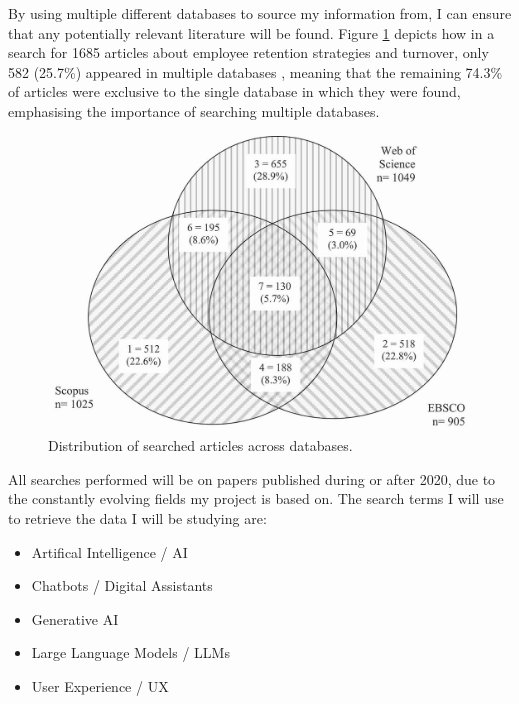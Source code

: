 \documentclass[12pt]{report}
\begin{document}
    \noindent By using multiple different databases to source my information from, I can ensure that
    any potentially relevant literature will be found. Figure \ref{fig:litSearch} depicts 
    how in a search for 1685 articles about employee retention strategies and turnover, only 582 (25.7\%) appeared in multiple databases
    \autocite{litSearch}, meaning that the remaining 74.3\% of articles were exclusive to the single 
    database in which they were found, emphasising the importance of searching multiple databases.  

    \begin{figure}[H]
        \centering
        \includegraphics[width=.6\linewidth]{litSearchDBs.jpg}
        \caption{Distribution of searched articles across databases. \autocite{litSearch}}
        \label{fig:litSearch}
    \end{figure}
   
    \noindent 
    All searches performed will be on papers published during or after 2020, due to the 
    constantly evolving fields my project is based on. The search terms I will use to retrieve
    the data I will be studying are:

    \begin{itemize}
        \item Artifical Intelligence / AI 
        \item Chatbots / Digital Assistants
        \item Generative AI
        \item Large Language Models / LLMs
        \item User Experience / UX
    \end{itemize}
\end{document}
